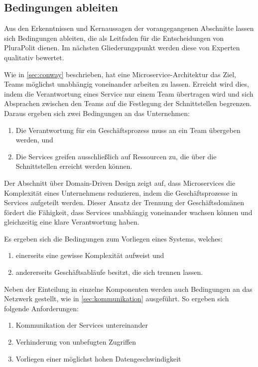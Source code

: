 \subsection{Bedingungen ableiten}
\label{sec:bedingungen}

Aus den Erkenntnissen und Kernaussagen der vorangegangenen Abschnitte lassen sich Bedingungen ableiten, die als Leitfaden für die Entscheidungen von PluraPolit dienen. Im nächsten Gliederungspunkt werden diese von Experten qualitativ bewertet.

Wie in \cref{sec:conway} beschrieben, hat eine Microservice-Architektur das Ziel, Teams möglichst unabhängig voneinander arbeiten zu lassen. Erreicht wird dies, indem die Verantwortung eines Service nur einem Team übertragen wird und sich Absprachen zwischen den Teams auf die Festlegung der Schnittstellen begrenzen. Daraus ergeben sich zwei Bedingungen an das Unternehmen:
\begin{enumerate}
	\item Die Verantwortung für ein Geschäftsprozess muss an ein Team übergeben werden, und
	\item Die Services greifen ausschließlich auf Ressourcen zu, die über die Schnittstellen erreicht werden können.
\end{enumerate}

Der Abschnitt über Domain-Driven Design zeigt auf, dass Microservices die Komplexität eines Unternehmens reduzieren, indem die Geschäftsprozesse in Services aufgeteilt werden. Dieser Ansatz der Trennung der Geschäftsdomänen fördert die Fähigkeit, dass Services unabhängig voneinander wachsen können und gleichzeitig eine klare Verantwortung haben.

Es ergeben sich die Bedingungen zum Vorliegen eines Systems, welches:
\begin{enumerate}
	\item einerseits eine gewisse Komplexität aufweist und
	\item andererseits Geschäftsabläufe besitzt, die sich trennen lassen.
\end{enumerate}

Neben der Einteilung in einzelne Komponenten werden auch Bedingungen an das Netzwerk gestellt, wie in \cref{sec:kommunikation} ausgeführt. So ergeben sich folgende Anforderungen:
\begin{enumerate}
	\item Kommunikation der Services untereinander
	\item Verhinderung von unbefugten Zugriffen
	\item Vorliegen einer möglichst hohen Datengeschwindigkeit
\end{enumerate}

